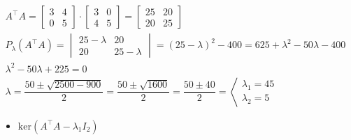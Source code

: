 \begin{enumerate}[label=\color{red}\textbf{\arabic*)}, leftmargin=*]
\begin{enumerate}[label=\color{red}\alph*)]
		$\begin{array}{l}
		A^\intercal A=\begin{bmatrix}
		3 & 4\\
		0 & 5
		\end{bmatrix}\cdot\begin{bmatrix}
		3 & 0\\
		4 & 5
		\end{bmatrix}=\begin{bmatrix}
		25 & 20\\
		20 & 25
		\end{bmatrix}\\
		P_{\lambda}(A^\intercal A)=\begin{vmatrix}
		25-\lambda & 20\\
		20 & 25-\lambda
		\end{vmatrix}=(25-\lambda)^2-400=625+\lambda^2-50\lambda-400\\
		\lambda^2-50\lambda+225=0\\
		\lambda=\dfrac{50\pm\sqrt{2500-900}}{2}=\dfrac{50\pm\sqrt{1600}}{2}=\dfrac{50\pm40}{2}=\left\langle\begin{array}{l}
		\lambda_1=45\\
		\lambda_2=5
		\end{array}\right.
		\end{array}$\\
		\begin{itemize}
		\item[$\bboxed{\lambda_1=45}$] $\mathrm{ker}(A^\intercal A-\lambda_1I_2)$
		

\end{itemize}
\end{enumerate}
\end{enumerate}
